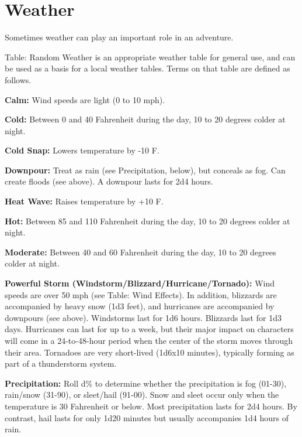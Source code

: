 \section{Weather}

Sometimes weather can play an important role in an adventure.

Table: Random Weather is an appropriate weather table for general use, and can 
be used as a basis for a local weather tables. Terms on that table are defined 
as follows.

\textbf{Calm:} Wind speeds are light (0 to 10 mph).

\textbf{Cold:} Between 0\textdegree{} and 40\textdegree{} Fahrenheit during the day, 10 to 20 degrees 
colder at night.

\textbf{Cold Snap:} Lowers temperature by -10\textdegree{} F.

\textbf{Downpour:} Treat as rain (see Precipitation, below), but conceals as fog. 
Can create floods (see above). A downpour lasts for 2d4 hours.

\textbf{Heat Wave:} Raises temperature by +10\textdegree{} F.

\textbf{Hot:} Between 85\textdegree{} and 110\textdegree{} Fahrenheit during the day, 10 to 20 degrees 
colder at night.

\textbf{Moderate:} Between 40\textdegree{} and 60\textdegree{} Fahrenheit during the day, 10 to 20 degrees 
colder at night.

\textbf{Powerful Storm (Windstorm/Blizzard/Hurricane/Tornado):}
Wind speeds are over 50 mph (see Table: Wind Effects). In addition, blizzards 
are accompanied by heavy snow (1d3 feet), and hurricanes are accompanied by downpours 
(see above). Windstorms last for 1d6 hours. Blizzards last for 1d3 days. Hurricanes 
can last for up to a week, but their major impact on characters will come in a 
24-to-48-hour period when the center of the storm moves through their area. Tornadoes 
are very short-lived (1d6x10 minutes), typically forming as part 
of a thunderstorm system. 

\textbf{Precipitation:} Roll d\% to determine whether the precipitation is fog 
(01-30), rain/snow (31-90), or sleet/hail (91-00). Snow and sleet occur only when 
the temperature is 30\textdegree{} Fahrenheit or below. Most precipitation lasts for 2d4 hours. 
By contrast, hail lasts for only 1d20 minutes but usually accompanies 1d4 hours 
of rain.

